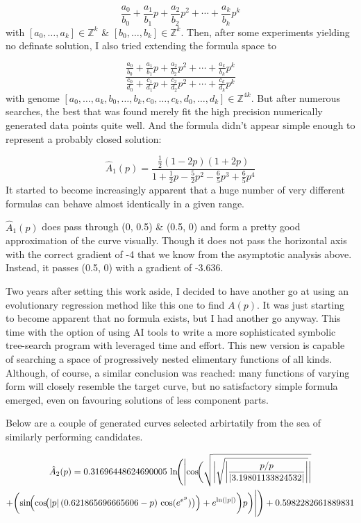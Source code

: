 \documentclass[11pt,a4paper]{article}
\theoremstyle{plain}
\theoremstyle{definition}
\begin{document}
$$\frac{a_0}{b_0} +\frac{a_1}{b_1}p +\frac{a_2}{b_2}p^2 +\cdots+\frac{a_k}{b_k}p^k$$
with $[a_0,\dots,a_k]\in\mathbb{Z}^k$ \& $[b_0,\dots,b_k]\in\mathbb{Z}^k$. Then, after some experiments yielding no definate solution, I also tried extending the formula space to 



$$\frac{\frac{a_0}{b_0} +\frac{a_1}{b_1}p +\frac{a_2}{b_2}p^2 +\cdots+\frac{a_k}{b_k}p^k}{\frac{c_0}{d_0} +\frac{c_1}{d_1}p +\frac{c_2}{d_2}p^2 +\cdots+\frac{c_k}{d_k}p^k}$$
with genome $[a_0,\dots,a_k,b_0,\dots,b_k,c_0,\dots,c_k,d_0,\dots,d_k]\in\mathbb{Z}^{4k}$.
But after numerous searches, the best that was found merely fit the high precision numerically generated data points quite well. And the formula didn't appear simple enough to represent a probably closed solution: 

$$\hat A_1(p) = \frac{\frac{1}{2}(1-2p)(1+2p)}{1 + \frac{1}{2}p - \frac{5}{2}p^2 - \frac{6}{5}p^3 + \frac{6}{5}p^4}$$
It started to become increasingly apparent that a huge number of very different formulas can behave almost identically in a given range. 

$\hat A_1(p)$ does pass through (0, 0.5) \& (0.5, 0) and form a pretty good approximation of the curve visually. Though it does not pass the horizontal axis with the correct gradient of -4 that we know from the asymptotic analysis above. Instead, it passes (0.5, 0) with a gradient of -3.636.

\vspace{10pt}
\noindent
Two years after setting this work aside, I decided to have another go at using an evolutionary regression method like this one to find $A(p)$.
It was just starting to become apparent that no formula exists, but I had another go anyway. This time with the option of using AI tools to write a 
more sophisticated symbolic tree-search program with leveraged time and effort. This new version is capable of searching a space of progressively nested elimentary functions of all kinds. Although, of course, a similar
conclusion was reached: many functions of varying form will closely resemble the target curve, but no satisfactory simple formula emerged, even on favouring solutions of less component parts.

Below are a couple of generated curves selected arbirtatily from the sea of similarly performing candidates.

\begin{multline*}
\hat A_2(p) = 0.31696448624690005 \,
\ln\!\Biggl(
\Biggl|
\cos\!\biggl(
\sqrt{
\biggl|
\sqrt{
\biggl|
\frac{p/p}{| 3.19801133824532 |}
\biggr|
}
\biggr|
} \\
+
\biggl(
\sin\!\Bigl(
\cos\!\bigl(
|p| \,
(0.621865696665606 - p)\,
\cos(e^{e^{p}})
\bigr)
\Bigr)
+
e^{\ln(|p|)}
\biggr) p
\biggr)
\Biggr|
\Biggr)
+ 0.5982282661889831
\end{multline*}
\end{document}
